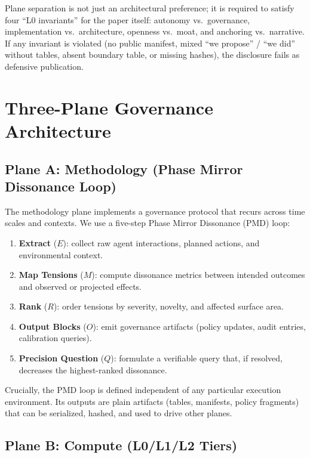 \documentclass[11pt]{article}
\begin{document}
Plane separation is not just an architectural preference; it is required to satisfy four ``L0 invariants'' for the paper itself: autonomy vs.\ governance, implementation vs.\ architecture, openness vs.\ moat, and anchoring vs.\ narrative. If any invariant is violated (no public manifest, mixed ``we propose'' / ``we did'' without tables, absent boundary table, or missing hashes), the disclosure fails as defensive publication.

\section{Three-Plane Governance Architecture}

\subsection{Plane A: Methodology (Phase Mirror Dissonance Loop)}

The methodology plane implements a governance protocol that recurs across time scales and contexts. We use a five-step Phase Mirror Dissonance (PMD) loop:

\begin{enumerate}[label=\arabic*.]
  \item \textbf{Extract} (\(E\)): collect raw agent interactions, planned actions, and environmental context.
  \item \textbf{Map Tensions} (\(M\)): compute dissonance metrics between intended outcomes and observed or projected effects.
  \item \textbf{Rank} (\(R\)): order tensions by severity, novelty, and affected surface area.
  \item \textbf{Output Blocks} (\(O\)): emit governance artifacts (policy updates, audit entries, calibration queries).
  \item \textbf{Precision Question} (\(Q\)): formulate a verifiable query that, if resolved, decreases the highest-ranked dissonance.
\end{enumerate}

Crucially, the PMD loop is defined independent of any particular execution environment. Its outputs are plain artifacts (tables, manifests, policy fragments) that can be serialized, hashed, and used to drive other planes.

\subsection{Plane B: Compute (L0/L1/L2 Tiers)}
\end{document}
